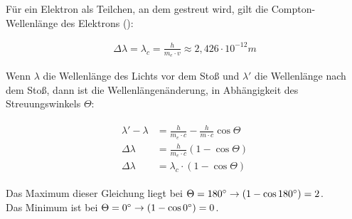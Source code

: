Für ein Elektron als Teilchen, an dem gestreut wird, gilt die Compton-Wellenlänge des Elektrons ():

\begin{align}
	\Delta \lambda = \lambda_c = \frac{h}{m_e \cdot v} \approx 2,426 \cdot 10^{-12}m
\end{align}

Wenn $\lambda$ die Wellenlänge des Lichts vor dem Stoß und $\lambda'$ die Wellenlänge nach dem Stoß, dann ist die Wellenlängenänderung, in Abhängigkeit des Streuungswinkels $\Theta$:

\begin{align}
\begin{split}
	\lambda' - \lambda &= \frac{h}{m_e \cdot c}-\frac{h}{m \cdot c} \cos{\Theta} \\
	\Delta\lambda &= \frac{h}{m_e \cdot c}(1-\cos{\Theta}) \\
	\Delta\lambda &= \lambda_c \cdot (1-\cos{\Theta})
\end{split}
\end{align}


\noindent Das Maximum dieser Gleichung liegt bei $\Theta = 180\degree \rightarrow (1-\cos{180\degree})=2$. \\
Das Minimum ist bei $\Theta = 0\degree \rightarrow (1-\cos{0\degree})=0$.
